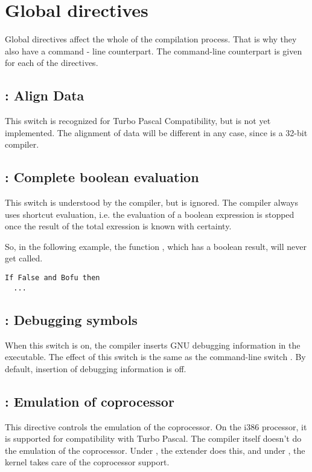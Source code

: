 \documentclass{report}
\begin{document}
\section{Global directives}
\label{se:GlobalSwitch}
Global directives affect the whole of the compilation process. That is why
they also have a command - line counterpart. The command-line counterpart is
given for each of the directives.

\subsection{ : Align Data}

This switch is recognized for Turbo Pascal Compatibility, but is not
yet implemented. The alignment of data will be different in any case, since
\fpc is a 32-bit compiler.

\subsection{ : Complete boolean evaluation}

This switch is understood by the \fpc compiler, but is ignored. The compiler
always uses shortcut evaluation, i.e. the evaluation of a boolean expression
is stopped once the result of the total exression is known with certainty.

So, in the following example, the function , which has a boolean
result, will never get called.
\begin{verbatim}
If False and Bofu then
  ...
\end{verbatim}

\subsection{ : Debugging symbols}

When this switch is on, the compiler inserts GNU debugging information in
the executable. The effect of this switch is the same as the command-line
switch . By default, insertion of debugging information is off.

\subsection{ : Emulation of coprocessor}
This directive controls the emulation of the coprocessor. On the i386
processor, it is supported for
compatibility with Turbo Pascal. The compiler itself doesn't do the emulation
of the coprocessor. Under \dos, the \dos extender does this, and under
\linux, the kernel takes care of the coprocessor support.
\end{document}
